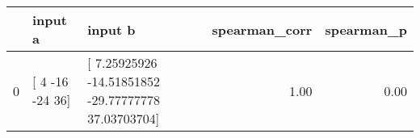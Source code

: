 \begin{tabular}{lllrr}
\toprule
 & input a & input b & spearman\_corr & spearman\_p \\
\midrule
0 & [  4 -16 -24  36] & [  7.25925926 -14.51851852 -29.77777778  37.03703704] & 1.00 & 0.00 \\
\bottomrule
\end{tabular}
